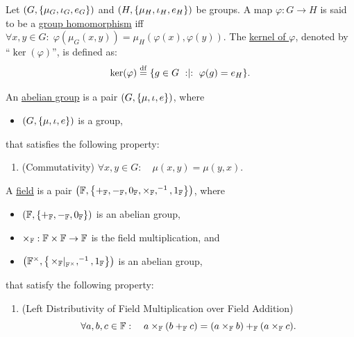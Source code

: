 \documentclass[11pt,reqno]{amsart}
\renewcommand{\phi}{\varphi}
\begin{document}
\begin{Def}
Let $(G,\set{\mu_G,\iota_G,e_G})$ and $(H,\set{\mu_H,\iota_H,e_H})$ be groups.
A map $\phi:G\to H$ is said to be a \ul{group homomorphism} iff
$\forall x,y\in G:\;\phi(\mu_G(x,y))=\mu_H(\phi(x),\phi(y))$.
The \ul{kernel of $\phi$}, denoted by ``$\ker(\phi)$'', is defined as:
\[
\ker(\phi)\df\set{g\in G\st\phi(g)=e_H}.
\]
\end{Def}

\begin{Def}
An \ul{abelian group} is a pair $(G,\set{\mu,\iota,e})$, where
\begin{itemize}
\item $(G,\set{\mu,\iota,e})$ is a group,
\end{itemize}
that satisfies the following property:
\begin{enumerate}
\item (Commutativity)
$\forall x,y\in G:\quad\mu(x,y)=\mu(y,x)$.
\end{enumerate}
\end{Def}

\begin{Def}
A \ul{field} is a pair $\Br{\F,\set{+_\F,-_\F,0_\F,\times_\F,\inv,1_\F}}$, where
\begin{itemize}
\item $\Br{\F,\set{+_\F,-_\F,0_\F}}$ is an abelian group,
\item $\times_{\mathbb{F}}:\mathbb{F}\times\mathbb{F}\to\mathbb{F}$ is the field multiplication, and
\item $\Br{\F^\times,\set{\eval{\times_\F}_{\F^\times},\inv,1_\F}}$ is an abelian group,
\end{itemize}
that satisfy the following property:
\begin{enumerate}
\item (Left Distributivity of Field Multiplication over Field Addition)
\[
\forall a,b,c\in\mathbb{F}:\quad
a\times_{\mathbb{F}}(b+_{\mathbb{F}} c)=(a\times_{\mathbb{F}} b)+_{\mathbb{F}}(a\times_{\mathbb{F}} c).
\]
\end{enumerate}
\end{Def}
\end{document}
